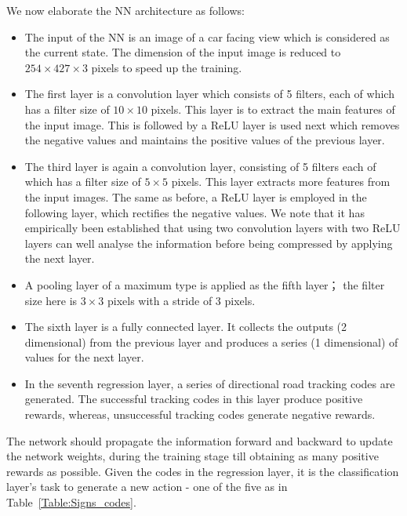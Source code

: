 \documentclass{svproc}
\begin{document}
	We now elaborate the NN architecture as follows:
	\begin{itemize}
		\item The input of the NN is an image of a car facing view which is considered as the current state. The dimension of the input image is reduced to $254 \times 427 \times 3$ pixels to speed up the training. 
		
		\item The first layer is a convolution layer which consists of 5 filters, each of which has a filter size of $10 \times 10$ pixels. This layer is to extract the main features of the input image. 
		This is followed by a ReLU layer is used next which removes the negative values and maintains the positive values of the previous layer. 
		
		\item The third layer is again a convolution layer, consisting of 5 filters each of which has a filter size of $5 \times 5$ pixels. This layer extracts more features from the input images. The same as before, a ReLU layer is employed in the following layer, which rectifies the negative values. We note that it has empirically been established that using two convolution layers with two ReLU layers can well analyse the information before being compressed by applying the next layer. 
		
		\item A pooling layer of a maximum type is applied as the fifth layer； the filter size here is $3 \times 3$ pixels with a stride of 3 pixels. 
		
		\item The sixth layer is a fully connected layer. It collects the outputs (2 dimensional) from the previous layer and produces a series (1 dimensional) of values for the next layer. 
		
		\item In the seventh regression layer, a series of directional road tracking codes are generated. The successful tracking codes in this layer produce positive rewards, whereas, unsuccessful tracking codes generate negative rewards. 
	\end{itemize}
	
	The network should propagate the information forward and backward to update the network weights, during the training stage till obtaining as many positive rewards as possible. Given the codes in the regression layer, it is the classification layer's task to generate a new action - one of the five as in Table~\ref{Table:Signs_codes}. 
	
\end{document}
